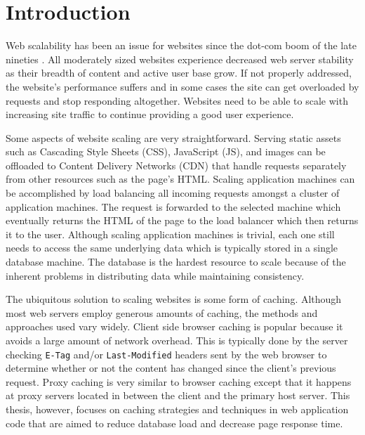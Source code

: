\documentclass[12pt]{ucthesis}
\begin{document}
\pagestyle{plain}




\renewcommand{\baselinestretch}{1.66}


\chapter{Introduction} \label{introduction}
Web scalability has been an issue for websites since the dot-com boom of the late nineties \cite{webServerScaling}.
All moderately sized websites experience decreased web server stability as their breadth of content and active user base grow.
If not properly addressed, the website's performance suffers and in some cases the site can get overloaded by requests and stop responding altogether.
Websites need to be able to scale with increasing site traffic to continue providing a good user experience.

Some aspects of website scaling are very straightforward.
Serving static assets such as Cascading Style Sheets (CSS), JavaScript (JS), and images can be offloaded to Content Delivery Networks (CDN) that handle requests separately from other resources such as the page's HTML\@.
Scaling application machines can be accomplished by load balancing all incoming requests amongst a cluster of application machines.
The request is forwarded to the selected machine which eventually returns the HTML of the page to the load balancer which then returns it to the user.
Although scaling application machines is trivial, each one still needs to access the same underlying data which is typically stored in a single database machine.
The database is the hardest resource to scale because of the inherent problems in distributing data while maintaining consistency.

The ubiquitous solution to scaling websites is some form of caching.
Although most web servers employ generous amounts of caching, the methods and approaches used vary widely.
Client side browser caching is popular because it avoids a large amount of network overhead.
This is typically done by the server checking {\tt E-Tag} and/or {\tt Last-Modified} headers sent by the web browser to determine whether or not the content has changed since the client's previous request.
Proxy caching is very similar to browser caching except that it happens at proxy servers located in between the client and the primary host server.
This thesis, however, focuses on caching strategies and techniques in web application code that are aimed to reduce database load and decrease page response time.
\end{document}
